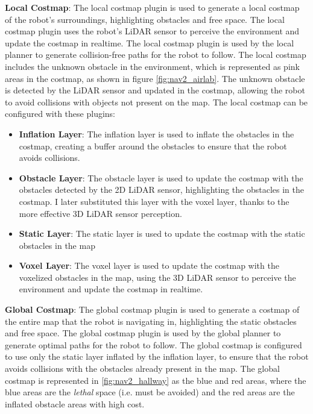 \textbf{Local Costmap}:
The local costmap plugin is used to generate a local costmap of the robot's surroundings, highlighting obstacles
and free space. The local costmap plugin uses the robot's LiDAR sensor to perceive the environment and update the costmap
in realtime. The local costmap plugin is used by the local planner to generate collision-free paths for the robot
to follow. The local costmap includes the unknown obstacle in the environment, which is represented as pink areas
in the costmap, as shown in figure \ref{fig:nav2_airlab}. The unknown obstacle is detected by the LiDAR sensor
and updated in the costmap, allowing the robot to avoid collisions with objects not present on the map.
The local costmap can be configured with these plugins:

\begin{itemize}
    \item \textbf{Inflation Layer}: The inflation layer is used to inflate the obstacles in the costmap, creating a buffer
    around the obstacles to ensure that the robot avoids collisions.
    \item \textbf{Obstacle Layer}: The obstacle layer is used to update the costmap with the obstacles detected by
    the 2D LiDAR sensor, highlighting the obstacles in the costmap. I later substituted this layer with the voxel layer,
    thanks to the more effective 3D LiDAR sensor perception.
    \item \textbf{Static Layer}: The static layer is used to update the costmap with the static obstacles in the map
    \item \textbf{Voxel Layer}: The voxel layer is used to update the costmap with the voxelized obstacles in the map,
    using the 3D LiDAR sensor to perceive the environment and update the costmap in realtime.
\end{itemize}

\textbf{Global Costmap}:
The global costmap plugin is used to generate a costmap of the entire map that the robot is navigating in, highlighting
the static obstacles and free space. The global costmap plugin is used by the global planner to generate optimal paths
for the robot to follow. The global costmap is configured to use only the static layer inflated by the inflation layer,
to ensure that the robot avoids collisions with the obstacles already present in the map.
The global costmap is represented in \ref{fig:nav2_hallway} as the blue and red areas, where the blue areas are the 
\textit{lethal} space (i.e. must be avoided) and the red areas are the inflated obstacle areas with high cost.

